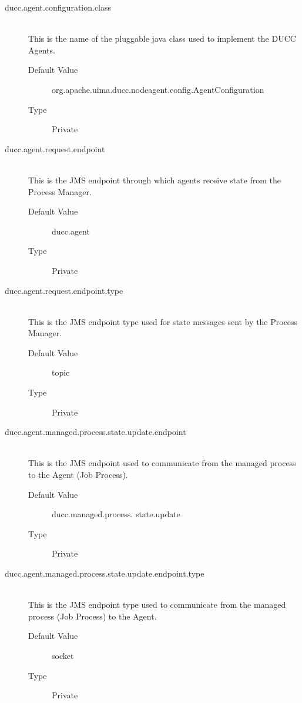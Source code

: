     \begin{description}


        \item[ducc.agent.configuration.class] \hfill \\
          This is the name of the pluggable java class used to implement the DUCC Agents. 
          \begin{description}
            \item[Default Value] org.apache.uima.ducc.nodeagent.config.AgentConfiguration 
            \item[Type] Private 
          \end{description}
          
        \item[ducc.agent.request.endpoint] \hfill \\
          This is the JMS endpoint through which agents receive state from the Process Manager. 
          \begin{description}
            \item[Default Value] ducc.agent 
            \item[Type] Private 
          \end{description}
          
        \item[ducc.agent.request.endpoint.type] \hfill \\
          This is the JMS endpoint type used for state messages sent by the Process Manager. 
          \begin{description}
            \item[Default Value] topic 
            \item[Type] Private 
          \end{description}
          
        \item[ducc.agent.managed.process.state.update.endpoint] \hfill \\
          This is the JMS endpoint used to communicate from the managed process to the Agent 
          (Job Process). 
          \begin{description}
            \item[Default Value] ducc.managed.process. state.update 
            \item[Type] Private
          \end{description} 
          
        \item[ducc.agent.managed.process.state.update.endpoint.type] \hfill \\
          This is the JMS endpoint type used to communicate from the managed process (Job 
          Process) to the Agent. 
          \begin{description}
            \item[Default Value] socket 
            \item[Type] Private 
          \end{description}
          

\end{description}
